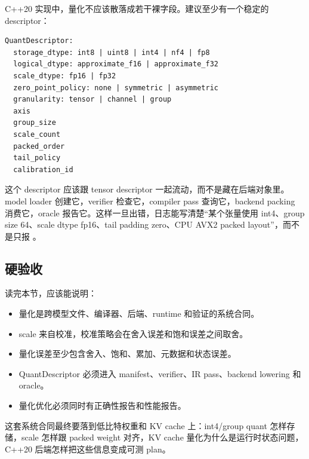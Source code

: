 C++20 实现中，量化不应该散落成若干裸字段。建议至少有一个稳定的 descriptor：

\begin{lstlisting}[numbers=none,caption={QuantDescriptor 的字段边界}]
QuantDescriptor:
  storage_dtype: int8 | uint8 | int4 | nf4 | fp8
  logical_dtype: approximate_f16 | approximate_f32
  scale_dtype: fp16 | fp32
  zero_point_policy: none | symmetric | asymmetric
  granularity: tensor | channel | group
  axis
  group_size
  scale_count
  packed_order
  tail_policy
  calibration_id
\end{lstlisting}

这个 descriptor 应该跟 tensor descriptor 一起流动，而不是藏在后端对象里。model loader 创建它，verifier 检查它，compiler pass 查询它，backend packing 消费它，oracle 报告它。这样一旦出错，日志能写清楚“某个张量使用 int4、group size 64、scale dtype fp16、tail padding zero、CPU AVX2 packed layout”，而不是只报 。

\subsection{硬验收}

读完本节，应该能说明：

\begin{itemize}
  \item 量化是跨模型文件、编译器、后端、runtime 和验证的系统合同。
  \item scale 来自校准，校准策略会在舍入误差和饱和误差之间取舍。
  \item 量化误差至少包含舍入、饱和、累加、元数据和状态误差。
  \item QuantDescriptor 必须进入 manifest、verifier、IR pass、backend lowering 和 oracle。
  \item 量化优化必须同时有正确性报告和性能报告。
\end{itemize}

这套系统合同最终要落到低比特权重和 KV cache 上：int4/group quant 怎样存储，scale 怎样跟 packed weight 对齐，KV cache 量化为什么是运行时状态问题，C++20 后端怎样把这些信息变成可测 plan。

